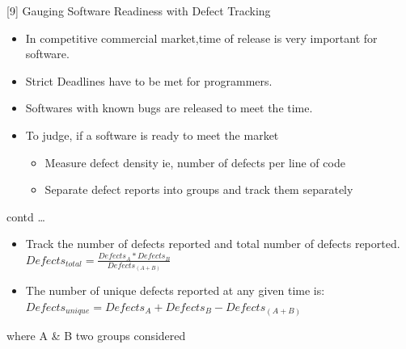 \documentclass[xcolor=x11names,compress]{beamer}
\renewcommand{\(}{\begin{columns}}
\renewcommand{\)}{\end{columns}}
\newcommand{\<}[1]{\begin{column}{#1}}
\renewcommand{\>}{\end{column}}
\begin{document}
\begin{frame}{[9] Gauging Software Readiness with Defect Tracking}
\begin{itemize}
	\item In competitive commercial market,time of release is very important for software.
	\item Strict Deadlines have to be met for programmers.
	\item Softwares with known bugs are released to meet the time.
	\newline
	\item To judge, if a software is ready to meet the market  
	\begin{itemize}
		\item Measure defect density ie, number of defects per line of code
		\item Separate defect reports into groups and track them separately
	\end{itemize}
\end{itemize}
\end{frame}
\begin{frame}{contd \dots}
	\begin{itemize}
		\item Track the number of defects reported and total number of defects reported. \newline
		{ $ Defects_{total} = \frac{Defects_{ A} * Defects_{ B}}{Defects_{ (A+B)}} $}\newline
		\item The number of unique defects reported at any given time is: \newline
		 $ Defects_{ unique} = Defects _{A} +  Defects_{ B} - Defects_{ (A+B)} $
	\end{itemize}
	where A \& B two groups considered
\end{frame}
\end{document}
